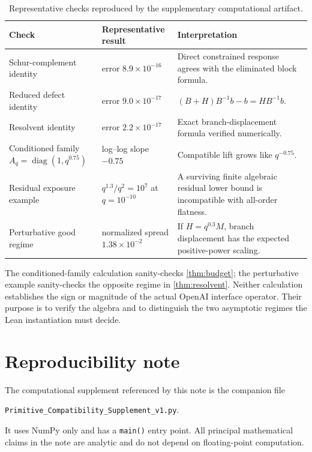 \documentclass[12pt]{article}
\theoremstyle{plain}
\theoremstyle{definition}
\theoremstyle{remark}
\begin{document}
\begin{table}[H]
\centering
\caption{Representative checks reproduced by the supplementary computational artifact.}
\small
\begin{tabular}{>{\raggedright\arraybackslash}p{}>{\raggedright\arraybackslash}p{}>{\raggedright\arraybackslash}p{}}
\toprule
Check & Representative result & Interpretation \\
\midrule
Schur-complement identity & error \(8.9\times10^{-16}\) & Direct constrained response agrees with the eliminated block formula. \\
Reduced defect identity & error \(9.0\times10^{-17}\) & \((B+H)B^{-1}b-b=HB^{-1}b\). \\
Resolvent identity & error \(2.2\times10^{-17}\) & Exact branch-displacement formula verified numerically. \\
Conditioned family \(A_q=\operatorname{diag}(1,q^{0.75})\) & log--log slope \(-0.75\) & Compatible lift grows like \(q^{-0.75}\). \\
Residual exposure example & \(q^{1.3}/q^2=10^7\) at \(q=10^{-10}\) & A surviving finite algebraic residual lower bound is incompatible with all-order flatness. \\
Perturbative good regime & normalized spread \(1.38\times10^{-2}\) & If \(H=q^{0.3}M\), branch displacement has the expected positive-power scaling. \\
\bottomrule
\end{tabular}
\end{table}

The conditioned-family calculation sanity-checks \cref{thm:budget}; the perturbative example sanity-checks the opposite regime in \cref{thm:resolvent}. Neither calculation establishes the sign or magnitude of the actual OpenAI interface operator. Their purpose is to verify the algebra and to distinguish the two asymptotic regimes the Lean instantiation must decide.

\section{Reproducibility note}
The computational supplement referenced by this note is the companion file
\begin{center}
\small\texttt{Primitive\_Compatibility\_Supplement\_v1.py}.
\end{center}
It uses NumPy only and has a \texttt{main()} entry point. All principal mathematical claims in the note are analytic and do not depend on floating-point computation.
\end{document}
